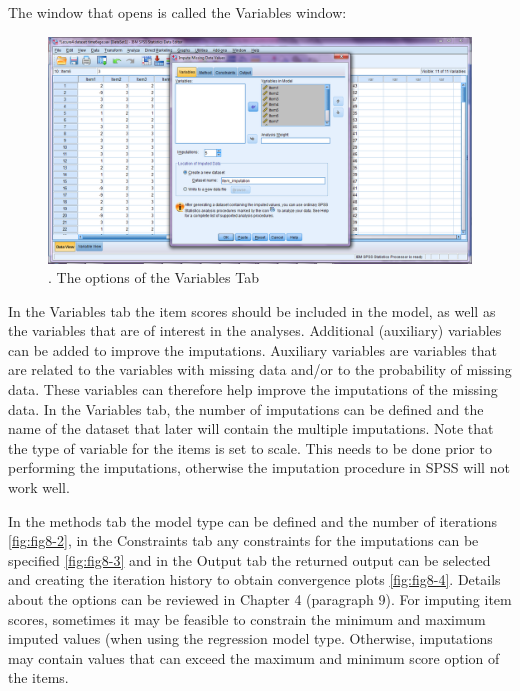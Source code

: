 \documentclass[
]{book}
\begin{document}
The window that opens is called the Variables window:

\begin{figure}

{\centering \includegraphics[width=0.9\linewidth]{images/fig8.1} 

}

\caption{. The options of the Variables Tab}\label{fig:fig8-1}
\end{figure}

In the Variables tab the item scores should be included in the model, as well as the variables that are of interest in the analyses. Additional (auxiliary) variables can be added to improve the imputations. Auxiliary variables are variables that are related to the variables with missing data and/or to the probability of missing data. These variables can therefore help improve the imputations of the missing data. In the Variables tab, the number of imputations can be defined and the name of the dataset that later will contain the multiple imputations.
Note that the type of variable for the items is set to scale. This needs to be done prior to performing the imputations, otherwise the imputation procedure in SPSS will not work well.

In the methods tab the model type can be defined and the number of iterations \ref{fig:fig8-2}, in the Constraints tab any constraints for the imputations can be specified \ref{fig:fig8-3} and in the Output tab the returned output can be selected and creating the iteration history to obtain convergence plots \ref{fig:fig8-4}. Details about the options can be reviewed in Chapter 4 (paragraph 9). For imputing item scores, sometimes it may be feasible to constrain the minimum and maximum imputed values (when using the regression model type. Otherwise, imputations may contain values that can exceed the maximum and minimum score option of the items.
\end{document}

